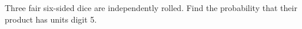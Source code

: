 Three fair six-sided dice are independently rolled. Find the probability that their product has units digit 5.

